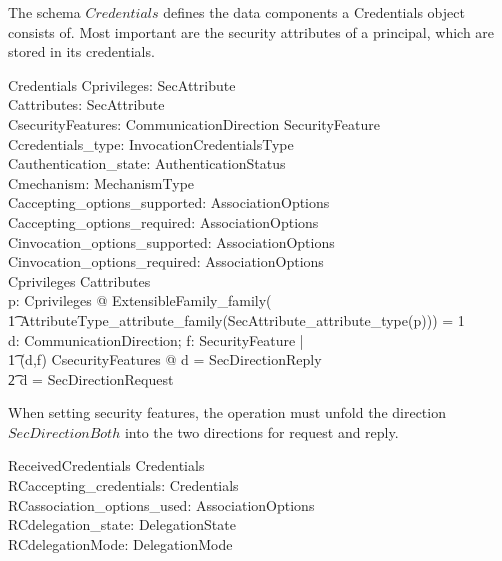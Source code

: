 The schema $Credentials$ defines the data components a Credentials object
consists of.  Most important are the security attributes of a principal, which
are stored in its credentials.
\begin{schema}{Credentials}
  Cprivileges: \power SecAttribute \\
  Cattributes: \power SecAttribute \\
  CsecurityFeatures: CommunicationDirection \rel SecurityFeature \\
  Ccredentials\_type: InvocationCredentialsType \\
  Cauthentication\_state: AuthenticationStatus \\
  Cmechanism: MechanismType \\
  Caccepting\_options\_supported: AssociationOptions \\
  Caccepting\_options\_required: AssociationOptions \\
  Cinvocation\_options\_supported: AssociationOptions \\
  Cinvocation\_options\_required: AssociationOptions \\
  \where
  Cprivileges \subset Cattributes \\
  \forall p: Cprivileges @ ExtensibleFamily\_family( \\
  \t1 AttributeType\_attribute\_family(SecAttribute\_attribute\_type(p))) = 1
  \\
  \forall d: CommunicationDirection; f: SecurityFeature | \\
  \t1 (d,f) \in CsecurityFeatures @ d = SecDirectionReply \lor \\
  \t2 d = SecDirectionRequest \\
\end{schema}
When setting security features, the operation must unfold the direction
$SecDirectionBoth$ into the two directions for request and reply.
\begin{schema}{ReceivedCredentials}
  Credentials \\
  RCaccepting\_credentials: Credentials \\
  RCassociation\_options\_used: AssociationOptions \\
  RCdelegation\_state: DelegationState \\
  RCdelegationMode: DelegationMode \\
\end{schema}


